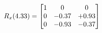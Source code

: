 \documentclass[preview]{standalone}
\begin{document}
\begin{align*}
\special{dvisvgm:raw <g id='unique000'>}R_{x}(4.33) = \begin{bmatrix}1 & 0 & 0 \\0 & -0.37 & +0.93 \\0 & -0.93 & -0.37\end{bmatrix}\special{dvisvgm:raw </g>}
\end{align*}
\end{document}

